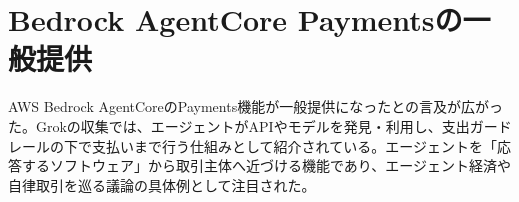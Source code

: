 \section{Bedrock AgentCore Paymentsの一般提供}
AWS Bedrock AgentCoreのPayments機能が一般提供になったとの言及が広がった。Grokの収集では、エージェントがAPIやモデルを発見・利用し、支出ガードレールの下で支払いまで行う仕組みとして紹介されている。エージェントを「応答するソフトウェア」から取引主体へ近づける機能であり、エージェント経済や自律取引を巡る議論の具体例として注目された。
